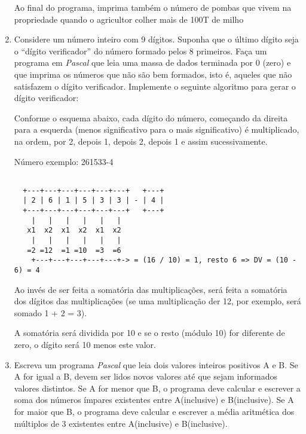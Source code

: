 \begin{enumerate}
Ao final do programa, imprima também o número de pombas que vivem na
propriedade quando o agricultor colher mais de 100T de milho

\item Considere um número inteiro com 9 dígitos. Suponha que o  último dígito seja o ``dígito verificador''
 do número formado pelos 8 primeiros. Faça um programa em \emph{Pascal} que leia uma massa de dados terminada por 0 (zero) e que
imprima os números que não são bem formados, isto é, aqueles que não satisfazem o dígito
verificador. Implemente o seguinte algoritmo para gerar o dígito verificador:

Conforme o esquema abaixo, cada dígito do número, começando da direita para a esquerda
(menos significativo para o mais significativo) é multiplicado, na ordem, por 2, depois 1,
depois 2, depois 1 e assim sucessivamente.

Número exemplo: 261533-4

\begin{center}
\begin{small}
\begin{verbatim}

  +---+---+---+---+---+---+   +---+
  | 2 | 6 | 1 | 5 | 3 | 3 | - | 4 |
  +---+---+---+---+---+---+   +---+
    |   |   |   |   |   |
   x1  x2  x1  x2  x1  x2
    |   |   |   |   |   |
   =2 =12  =1 =10  =3  =6
    +---+---+---+---+---+-> = (16 / 10) = 1, resto 6 => DV = (10 - 6) = 4 

\end{verbatim}
\end{small}
\end{center}

Ao invés de ser feita a somatória das multiplicações, será feita a somatória dos dígitos das multiplicações
(se uma multiplicação der 12, por exemplo, será somado 1 + 2 = 3).

A somatória será dividida por 10 e se o resto (módulo 10) for diferente de zero, o dígito será 10 menos este valor.

\item 
Escreva um programa \emph{Pascal} que leia dois valores inteiros positivos A e B.
Se A for igual a B, devem ser lidos novos valores até que sejam informados
valores distintos.  Se A for menor que B, o programa deve calcular e
escrever a soma dos números ímpares existentes entre A(inclusive) e
B(inclusive).  Se A for maior que B, o programa deve calcular e escrever a
média aritmética dos múltiplos de 3 existentes entre A(inclusive) e
B(inclusive).



\end{enumerate}
